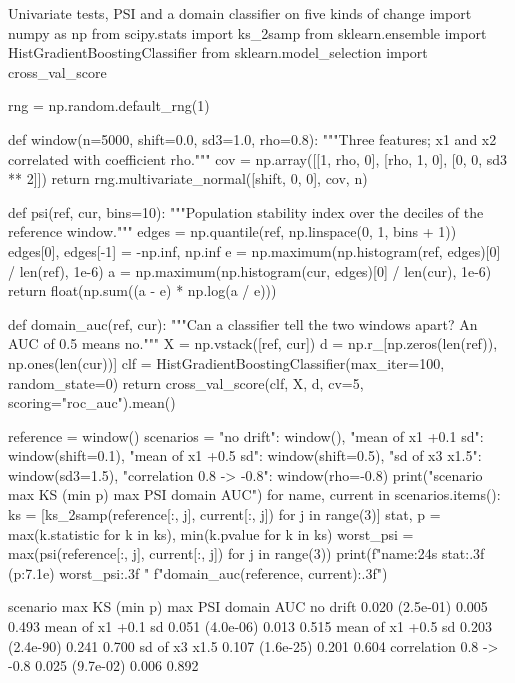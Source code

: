 \begin{pylisting}[label={lst:datadrift}]{Univariate tests, PSI and a domain classifier on five kinds of change}
import numpy as np
from scipy.stats import ks_2samp
from sklearn.ensemble import HistGradientBoostingClassifier
from sklearn.model_selection import cross_val_score

rng = np.random.default_rng(1)

def window(n=5000, shift=0.0, sd3=1.0, rho=0.8):
    """Three features; x1 and x2 correlated with coefficient rho."""
    cov = np.array([[1, rho, 0], [rho, 1, 0], [0, 0, sd3 ** 2]])
    return rng.multivariate_normal([shift, 0, 0], cov, n)

def psi(ref, cur, bins=10):
    """Population stability index over the deciles of the reference window."""
    edges = np.quantile(ref, np.linspace(0, 1, bins + 1))
    edges[0], edges[-1] = -np.inf, np.inf
    e = np.maximum(np.histogram(ref, edges)[0] / len(ref), 1e-6)
    a = np.maximum(np.histogram(cur, edges)[0] / len(cur), 1e-6)
    return float(np.sum((a - e) * np.log(a / e)))

def domain_auc(ref, cur):
    """Can a classifier tell the two windows apart? An AUC of 0.5 means no."""
    X = np.vstack([ref, cur])
    d = np.r_[np.zeros(len(ref)), np.ones(len(cur))]
    clf = HistGradientBoostingClassifier(max_iter=100, random_state=0)
    return cross_val_score(clf, X, d, cv=5, scoring="roc_auc").mean()

reference = window()
scenarios = {"no drift": window(), "mean of x1 +0.1 sd": window(shift=0.1),
             "mean of x1 +0.5 sd": window(shift=0.5), "sd of x3 x1.5": window(sd3=1.5),
             "correlation 0.8 -> -0.8": window(rho=-0.8)}
print("scenario                  max KS (min p)    max PSI   domain AUC")
for name, current in scenarios.items():
    ks = [ks_2samp(reference[:, j], current[:, j]) for j in range(3)]
    stat, p = max(k.statistic for k in ks), min(k.pvalue for k in ks)
    worst_psi = max(psi(reference[:, j], current[:, j]) for j in range(3))
    print(f"{name:24s}  {stat:.3f} ({p:7.1e})   {worst_psi:.3f}     "
          f"{domain_auc(reference, current):.3f}")
\end{pylisting}
\begin{pyoutput}
scenario                  max KS (min p)    max PSI   domain AUC
no drift                  0.020 (2.5e-01)   0.005     0.493
mean of x1 +0.1 sd        0.051 (4.0e-06)   0.013     0.515
mean of x1 +0.5 sd        0.203 (2.4e-90)   0.241     0.700
sd of x3 x1.5             0.107 (1.6e-25)   0.201     0.604
correlation 0.8 -> -0.8   0.025 (9.7e-02)   0.006     0.892
\end{pyoutput}

